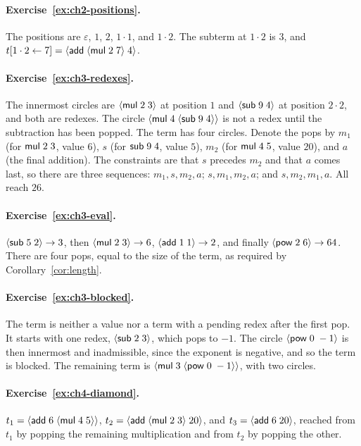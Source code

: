 \paragraph{Exercise~\ref{ex:ch2-positions}.}
The positions are $\varepsilon$, $1$, $2$, $1\cdot1$, and $1\cdot2$. The subterm at $1\cdot2$ is $3$, and $t[1\cdot2\leftarrow7]=\langle \mathsf{add}\; \langle \mathsf{mul}\; 2\; 7\rangle\; 4\rangle$.

\paragraph{Exercise~\ref{ex:ch3-redexes}.}
The innermost circles are $\langle \mathsf{mul}\; 2\; 3\rangle$ at position $1$ and $\langle \mathsf{sub}\; 9\; 4\rangle$ at position $2\cdot2$, and both are redexes. The circle $\langle \mathsf{mul}\; 4\; \langle \mathsf{sub}\; 9\; 4\rangle\rangle$ is not a redex until the subtraction has been popped. The term has four circles. Denote the pops by $m_1$ (for $\mathsf{mul}\;2\;3$, value $6$), $s$ (for $\mathsf{sub}\;9\;4$, value $5$), $m_2$ (for $\mathsf{mul}\;4\;5$, value $20$), and $a$ (the final addition). The constraints are that $s$ precedes $m_2$ and that $a$ comes last, so there are three sequences: $m_1,s,m_2,a$; $s,m_1,m_2,a$; and $s,m_2,m_1,a$. All reach $26$.

\paragraph{Exercise~\ref{ex:ch3-eval}.}
$\langle \mathsf{sub}\; 5\; 2\rangle\to3$, then $\langle \mathsf{mul}\; 2\; 3\rangle\to6$, $\langle \mathsf{add}\; 1\; 1\rangle\to2$, and finally $\langle \mathsf{pow}\; 2\; 6\rangle\to64$. There are four pops, equal to the size of the term, as required by Corollary~\ref{cor:length}.

\paragraph{Exercise~\ref{ex:ch3-blocked}.}
The term is neither a value nor a term with a pending redex after the first pop. It starts with one redex, $\langle \mathsf{sub}\; 2\; 3\rangle$, which pops to $-1$. The circle $\langle \mathsf{pow}\; 0\; -1\rangle$ is then innermost and inadmissible, since the exponent is negative, and so the term is blocked. The remaining term is $\langle \mathsf{mul}\; 3\; \langle \mathsf{pow}\; 0\; -1\rangle\rangle$, with two circles.

\paragraph{Exercise~\ref{ex:ch4-diamond}.}
$t_1=\langle \mathsf{add}\; 6\; \langle \mathsf{mul}\; 4\; 5\rangle\rangle$, $t_2=\langle \mathsf{add}\; \langle \mathsf{mul}\; 2\; 3\rangle\; 20\rangle$, and $t_3=\langle \mathsf{add}\; 6\; 20\rangle$, reached from $t_1$ by popping the remaining multiplication and from $t_2$ by popping the other.


